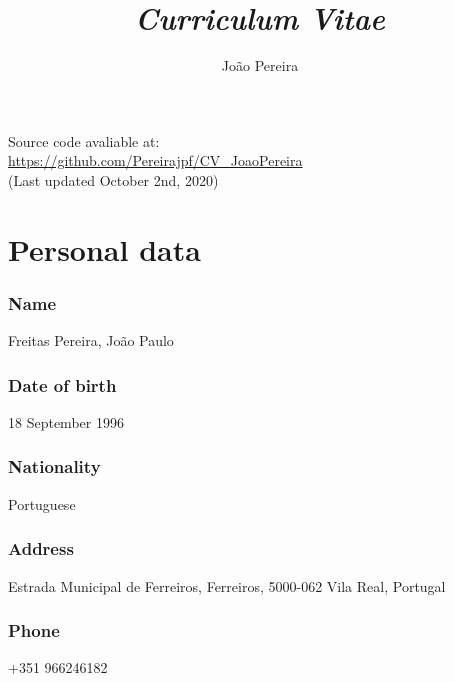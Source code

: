 \documentclass{article}
\renewcommand{\maketitle}{
\begin{center}
\raggedleft
{\Huge\bfseries\theauthor}

\vspace{1mm}
{\large\thetitle}

\vspace{10mm}
\end{center}
}
\begin{document}
\title{\textit{Curriculum Vitae}}
\author{João Pereira}

\begin{minipage}{0.65\textwidth}
\begingroup
\maketitle
\endgroup
\end{minipage}
\begin{minipage}{0.3\textwidth}
\end{minipage}

\begin{flushright}
{\color{gray}
Source code avaliable at:\\
\url{https://github.com/Pereirajpf/CV_JoaoPereira}\\
(Last updated October 2nd, 2020)
}
\end{flushright}

\section{Personal data}
\subsubsection{Name} 
Freitas Pereira, João Paulo
\subsubsection{Date of birth}
18 September 1996
\subsubsection{Nationality}
Portuguese
\subsubsection{Address}
Estrada Municipal de Ferreiros, Ferreiros, 5000-062 Vila Real, Portugal
\subsubsection{Phone}
+351 966246182
\end{document}
